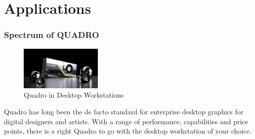 \documentclass[xcolor=x11names,table]{beamer}
\begin{document}
\section{Applications}
\begin{frame}[allowframebreaks]
\frametitle{Spectrum of QUADRO}
\begin{block}{
\begin{figure}[H]
	\includegraphics[width=150px]{refs/quadro-design-vis-quadro-rtx-8000-625-u@2x.jpg}
	\caption{{\footnotesize Quadro in Desktop Workstations}}
\end{figure}
}
{
Quadro has long been the \gls{de facto standard} for enterprise desktop graphics for digital designers and artists. With a range of performance, capabilities and price points, there is a right Quadro to go with the desktop workstation of your choice.
}
\end{block}
\end{frame}
\end{document}
